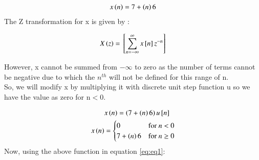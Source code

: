 \documentclass[journal,12pt,twocolumn]{IEEEtran}
\theoremstyle{remark}
\begin{document}
\begin{align}
x\left(n\right) = 7 + \left(n\right)6
\end{align}
The Z transformation for x is given by :

\begin{align}  \label{eq:eq1}
    X\left(z\right) ={}\left[\sum_{n=-\infty}^{\infty}x{}\left[n\right]z^{-n}\right]
\end{align}

However, x cannot be summed from $-\infty$ to zero as the number of terms cannot be negative due to which the $n^{th}$ will not be defined for this range of n.\\
So, we will modify x by multiplying it with discrete unit step function u so we have the value as zero for n$<$0.

\begin{align}
&x\left(n\right) = \left(7 + \left(n\right)6\right)u{}\left[n\right] \\
     x\left(n\right) & = \begin{cases} 
        0 & \text{for } n < 0 \\
        7 + \left(n\right)6 & \text{for } n \geq 0
    \end{cases}
\end{align}
Now, using the above function in equation \eqref{eq:eq1}: 
\end{document}
